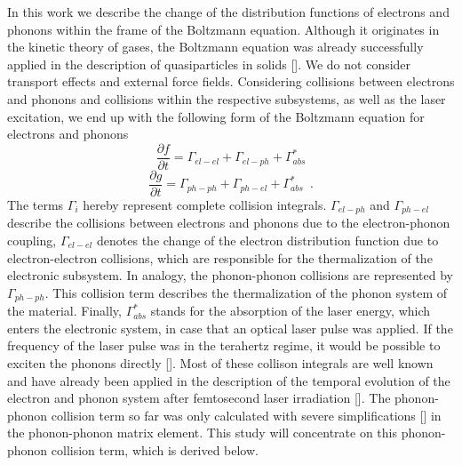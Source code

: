 \documentclass[ aps, prb, reprint, groupedaddress]{revtex4-1}
\makeatletter
\newcommand{\citen}[1]{\def\NAT@spacechar{}[\citenum{#1}]}
\makeatother
\begin{document}
In this work we describe the change of the distribution functions of electrons and phonons within the frame of the Boltzmann equation.
Although it originates in the kinetic theory of gases, the Boltzmann equation was already successfully applied in the description of quasiparticles in solids \citen{Rethfeld02met, Kaiser00, DelFatti00, Pietanza07}.
We do not consider transport effects and external force fields.
Considering collisions between electrons and phonons and collisions within the respective subsystems, as well as the laser excitation, we end up with the following form of the Boltzmann equation for electrons and phonons
\begin{equation}
\frac{\partial f}{\partial t} =\Gamma_{el-el}+\Gamma_{el-ph}+\Gamma_{abs}^*
\end{equation}
\begin{equation}
\frac{\partial g}{\partial t} =\Gamma_{ph-ph}+\Gamma_{ph-el}+\Gamma_{abs}^* \enspace .
\end{equation}
The terms $\Gamma_i$ hereby represent complete collision integrals. $\Gamma_{el-ph}$ and $\Gamma_{ph-el}$ describe the collisions between electrons and phonons due to the electron-phonon coupling, 
$\Gamma_{el-el}$ denotes the
change of the electron distribution function due to electron-electron collisions, which are responsible for the thermalization of the electronic subsystem. In analogy, the phonon-phonon collisions are represented
by $\Gamma_{ph-ph}$. This collision term describes the thermalization of the phonon system of the material. Finally, $\Gamma_{abs}^*$ stands for the absorption of the laser energy, which enters the electronic system, in 
case that an optical laser pulse was applied. If the frequency of the laser pulse was in the terahertz regime, it would be possible to exciten the phonons directly \citen{Manceau10}.
Most of these collison integrals are well known and have already been applied in the description of the temporal evolution of the electron and phonon system after femtosecond laser irradiation 
\citen{Rethfeld02met, Kaiser00, Mueller13PRB, Pietanza07}. %
The phonon-phonon collision term so far was only calculated with severe simplifications \citen{Ono17} in the phonon-phonon matrix element.
This study will concentrate on this phonon-phonon collision term, which is derived below. 
\end{document}
